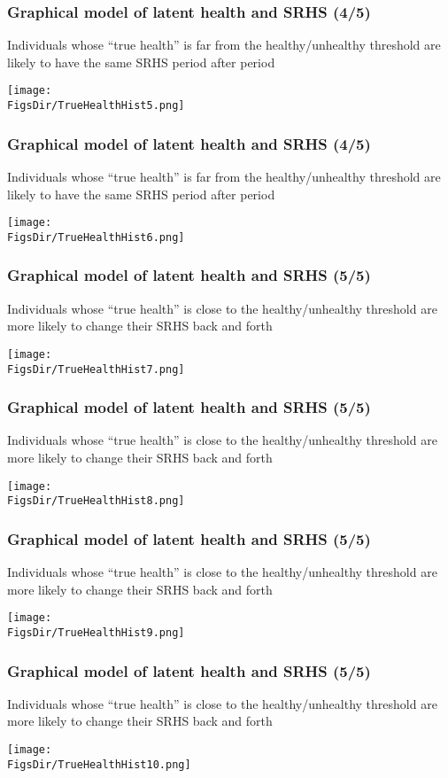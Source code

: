 \documentclass[aspectratio=169]{beamer}
\newcommand{\FigsDir}{../Figures}
\begin{document}
\begin{frame}\frametitle{Graphical model of latent health and SRHS (4/5)}
Individuals whose ``true health'' is far from the healthy/unhealthy threshold are likely to have the same SRHS period after period
\begin{center}
	\texttt{[image: \\FigsDir/TrueHealthHist5.png]}
\end{center}
\end{frame}

\begin{frame}\frametitle{Graphical model of latent health and SRHS (4/5)}
Individuals whose ``true health'' is far from the healthy/unhealthy threshold are likely to have the same SRHS period after period
\begin{center}
	\texttt{[image: \\FigsDir/TrueHealthHist6.png]}
\end{center}
\end{frame}


\begin{frame}\frametitle{Graphical model of latent health and SRHS (5/5)}
Individuals whose ``true health'' is close to the healthy/unhealthy threshold are more likely to change their SRHS back and forth
\begin{center}
	\texttt{[image: \\FigsDir/TrueHealthHist7.png]}
\end{center}
\end{frame}

\begin{frame}\frametitle{Graphical model of latent health and SRHS (5/5)}
Individuals whose ``true health'' is close to the healthy/unhealthy threshold are more likely to change their SRHS back and forth
\begin{center}
	\texttt{[image: \\FigsDir/TrueHealthHist8.png]}
\end{center}
\end{frame}

\begin{frame}\frametitle{Graphical model of latent health and SRHS (5/5)}
Individuals whose ``true health'' is close to the healthy/unhealthy threshold are more likely to change their SRHS back and forth
\begin{center}
	\texttt{[image: \\FigsDir/TrueHealthHist9.png]}
\end{center}
\end{frame}

\begin{frame}\frametitle{Graphical model of latent health and SRHS (5/5)}
Individuals whose ``true health'' is close to the healthy/unhealthy threshold are more likely to change their SRHS back and forth
\begin{center}
	\texttt{[image: \\FigsDir/TrueHealthHist10.png]}
\end{center}
\end{frame}
\end{document}
